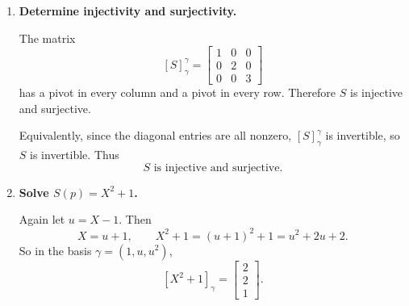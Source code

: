 \documentclass[12pt]{article}
\begin{document}
\begin{enumerate}[label=(\alph*)]
Thus
\[
[S(1)]_\gamma=\begin{bmatrix}1\\0\\0\end{bmatrix},\qquad
[S(u)]_\gamma=\begin{bmatrix}0\\2\\0\end{bmatrix},\qquad
[S(u^2)]_\gamma=\begin{bmatrix}0\\0\\3\end{bmatrix}.
\]
Therefore
\[
[S]^\gamma_\gamma=
\begin{bmatrix}
1&0&0\\
0&2&0\\
0&0&3
\end{bmatrix}.
\]
Hence
\[
\boxed{
[S]^\gamma_\gamma=
\begin{bmatrix}
1&0&0\\
0&2&0\\
0&0&3
\end{bmatrix}.}
\]

\item \textbf{Determine injectivity and surjectivity.}

The matrix
\[
[S]^\gamma_\gamma=
\begin{bmatrix}
1&0&0\\
0&2&0\\
0&0&3
\end{bmatrix}
\]
has a pivot in every column and a pivot in every row. Therefore \(S\) is injective and surjective.

Equivalently, since the diagonal entries are all nonzero, \([S]^\gamma_\gamma\) is invertible, so \(S\) is invertible. Thus
\[
\boxed{S\text{ is injective and surjective.}}
\]

\item \textbf{Solve \(S(p)=X^2+1\).}

Again let \(u=X-1\). Then
\[
X=u+1,
\qquad
X^2+1=(u+1)^2+1=u^2+2u+2.
\]
So in the basis \(\gamma=(1,u,u^2)\),
\[
[X^2+1]_\gamma=\begin{bmatrix}2\\2\\1\end{bmatrix}.
\]


\end{enumerate}
\end{document}
